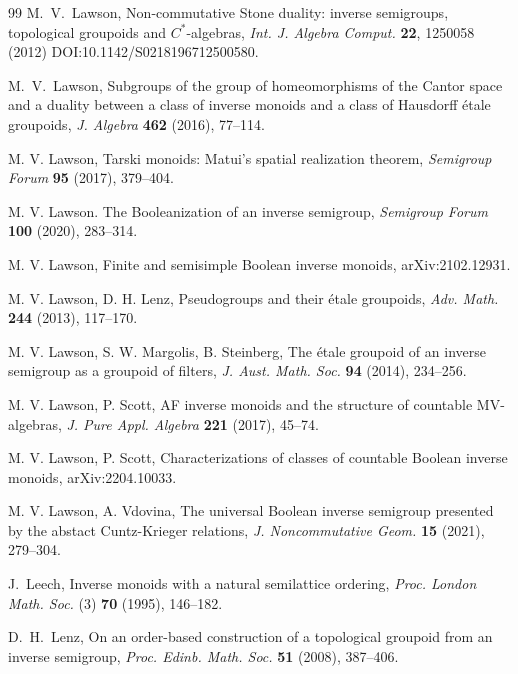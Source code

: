 \documentclass[a4paper]{amsart}
\begin{document}
\begin{thebibliography}{99}
 M.~V.~Lawson, Non-commutative Stone duality: inverse semigroups, topological groupoids and $C^{\ast}$-algebras,  
{\em Int. J. Algebra Comput.} {\bf 22}, 1250058 (2012) DOI:10.1142/S0218196712500580. 

 M.~V.~Lawson, Subgroups of the group of homeomorphisms of the Cantor space and a duality 
between a class of inverse monoids and a class of Hausdorff \'etale groupoids, 
{\em J. Algebra} {\bf 462} (2016), 77--114.

 M. V. Lawson, Tarski monoids: Matui's spatial realization theorem, {\em Semigroup Forum} {\bf 95} (2017), 379--404.

 M. V. Lawson. The Booleanization of an inverse semigroup, {\em Semigroup Forum} {\bf 100} (2020), 283--314.

 M. V. Lawson, Finite and semisimple Boolean inverse monoids, arXiv:2102.12931. 

 M. V. Lawson, D. H. Lenz, Pseudogroups and their \'etale groupoids, {\em Adv. Math.} {\bf 244} (2013), 117--170.

 M. V. Lawson, S. W. Margolis, B. Steinberg, The \'etale groupoid of an inverse semigroup as a groupoid of filters, {\em J. Aust. Math. Soc.} {\bf 94} (2014), 234--256. 

 M. V. Lawson, P. Scott, AF inverse monoids and the structure of countable MV-algebras, {\em J. Pure Appl. Algebra} {\bf 221} (2017), 45--74.

 M. V. Lawson, P. Scott, Characterizations of classes of countable Boolean inverse monoids, arXiv:2204.10033.

 M. V. Lawson, A. Vdovina, The universal Boolean inverse semigroup presented by the abstact Cuntz-Krieger relations,
{\em J. Noncommutative Geom.} {\bf 15} (2021), 279--304.

 J.~Leech, Inverse monoids with a natural semilattice ordering, {\em Proc. London Math. Soc.} (3) {\bf 70} (1995), 146--182.

 D.~H.~Lenz, On an order-based construction of a topological groupoid from an inverse semigroup, \emph{Proc. Edinb. Math. Soc.} {\bf 51} (2008), 387--406.


\end{thebibliography}
\end{document}
